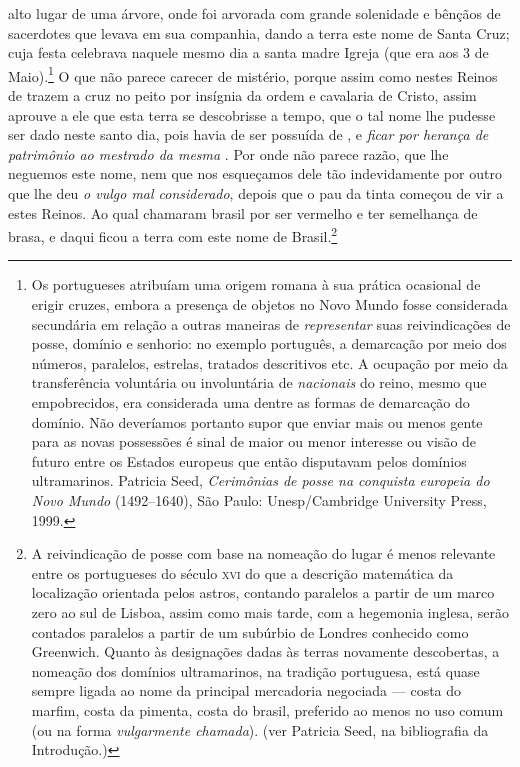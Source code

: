 alto lugar de uma árvore, onde foi arvorada com grande solenidade e
bênçãos de sacerdotes que levava em sua companhia, dando a terra este
nome de Santa Cruz; cuja festa celebrava naquele mesmo dia a santa			%
madre Igreja (que era aos 3 de Maio).\footnote{ Os portugueses
atribuíam uma origem romana à sua prática ocasional de erigir cruzes,
embora a presença de objetos no Novo Mundo fosse considerada secundária
em relação a outras maneiras de \textit{representar} suas
reivindicações de posse, domínio e senhorio: no exemplo português, a
demarcação por meio dos números, paralelos, estrelas, tratados
descritivos etc. A ocupação por meio da transferência voluntária ou
involuntária de \textit{nacionais} do reino, mesmo que empobrecidos,
era considerada uma dentre as formas de demarcação do domínio. Não
deveríamos portanto supor que enviar mais ou menos gente para as novas
possessões é sinal de maior ou menor interesse ou visão de futuro entre
os Estados europeus que então disputavam pelos domínios ultramarinos.
Patricia Seed, \textit{Cerimônias de posse na conquista europeia do Novo
Mundo} (1492--1640), São Paulo: Unesp/Cambridge University Press, 1999.} 
O que não parece carecer de
mistério, porque assim como nestes Reinos de  trazem a cruz no
peito por insígnia da ordem e cavalaria de Cristo, assim aprouve a ele
que esta terra se descobrisse a tempo, que o tal nome lhe pudesse ser
dado neste santo dia, pois havia de ser possuída de , e
\textit{ficar por herança de patrimônio ao mestrado da mesma }. Por onde não parece razão, que lhe neguemos este nome, nem
que nos esqueçamos dele tão indevidamente por outro que lhe deu
\textit{o vulgo mal considerado}, depois que o pau da tinta começou de			%
vir a estes Reinos. Ao qual chamaram brasil por ser vermelho e ter
semelhança de brasa, e daqui ficou a terra com este nome de
Brasil.\footnote{ A reivindicação de posse com
base na nomeação do lugar é menos relevante entre os portugueses do
século \textsc{xvi} do que a descrição matemática da localização orientada pelos
astros, contando paralelos a partir de um marco zero ao sul de Lisboa,
assim como mais tarde, com a hegemonia inglesa, serão contados paralelos
a partir de um subúrbio de Londres conhecido como Greenwich. Quanto às
designações dadas às terras novamente descobertas, a nomeação dos
domínios ultramarinos, na tradição portuguesa, está quase sempre ligada
ao nome da principal mercadoria negociada --- costa do marfim, costa da
pimenta, costa do brasil, preferido ao menos no uso comum (ou na
forma \textit{vulgarmente chamada}). (ver Patricia Seed, na bibliografia da Introdução.)} 
